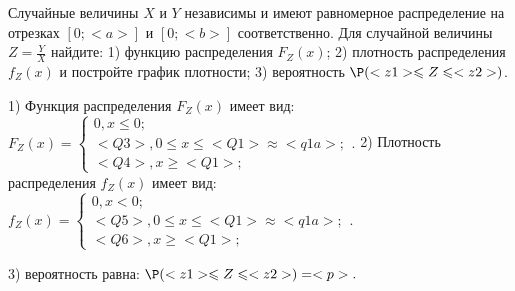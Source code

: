 \documentclass{article}%
\begin{document}
\begin{problem}
Случайные величины $X$ и $Y$ независимы и имеют равномерное
распределение на отрезках $[0;<a>]$ и $[0;<b>]$ соответственно. Для случайной величины $Z=\frac{Y}{X}$ найдите:
1) функцию распределения $F_Z(x)$;
2) плотность распределения $f_Z(x)$ и постройте график плотности;
3) вероятность $\P(<z1>\leqslant Z\leqslant <z2>)$.
\end{problem}

\begin{solution*}
1) Функция распределения $F_Z(x)$ имеет вид:
$
F_Z(x)=\left\{
\begin{array}{l}
0, x\leqslant 0;\\
<Q3>, 0\leqslant x\leqslant <Q1>\approx <q1a>;\\
<Q4>, x\geqslant<Q1>;
\end{array}.
\right.
$
2) Плотность распределения $f_Z(x)$ имеет вид:
$
f_Z(x)=\left\{
\begin{array}{l}
0, x<0;\\
<Q5>, 0\leqslant x\leqslant <Q1>\approx <q1a>;\\
<Q6>, x\geqslant<Q1>;
\end{array}.
\right.
$

3) вероятность равна:
$
\P(<z1>\leqslant Z\leqslant <z2>)=
<p>.
$
\end{solution*}
\end{document}
